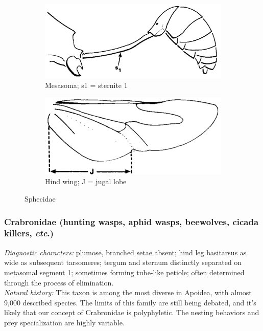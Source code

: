 \documentclass[letterpaper, 11pt]{article}
\begin{document}
\begin{figure}[ht!]
    \centering
    \begin{subfigure}[ht!]{0.45\textwidth}
        \includegraphics[width=\textwidth]{SphecidMetasoma}
        \caption{Mesasoma; s1 = sternite 1}
        \label{fig:sphecid1}
    \end{subfigure}
    \qquad
    \begin{subfigure}[ht!]{0.45\textwidth}
        \includegraphics[width=\textwidth]{SphecidWing}
        \caption{Hind wing; J = jugal lobe}
        \label{fig:sphecid2}
    \end{subfigure}
    \caption{Sphecidae \citep[][pg. 281]{goulet1993hymenoptera}}\label{fig:sphecids}
\end{figure}

\subsubsection{Crabronidae (hunting wasps, aphid wasps, beewolves, cicada killers, \textit{etc}.)}
\noindent{}\textit{Diagnostic characters:} plumose, branched setae absent; hind leg basitarsus as wide as subsequent tarsomeres; tergum and sternum distinctly separated on metasomal segment 1; sometimes forming tube-like petiole; often determined through the process of elimination.\\

\noindent{}\textit{Natural history:} This taxon is among the most diverse in Apoidea, with almost 9,000 described species. The limits of this family are still being debated, and it's likely that our concept of Crabronidae is polyphyletic. The nesting behaviors and prey specialization are highly variable.\\
\end{document}
